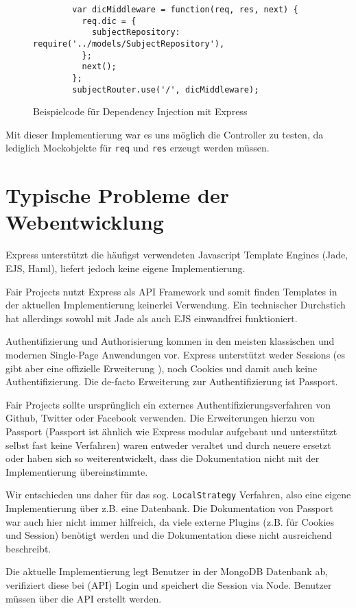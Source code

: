 \begin{figure}[h]
	\centering
	\begin{lstlisting}
		var dicMiddleware = function(req, res, next) {
		  req.dic = {
		    subjectRepository: require('../models/SubjectRepository'),
		  };
		  next();
		};
		subjectRouter.use('/', dicMiddleware);
	\end{lstlisting}
	\caption[dicMiddleware]{Beispielcode für Dependency Injection mit Express}
	\label{f:dicMiddleware}
\end{figure}

Mit dieser Implementierung war es uns möglich die Controller zu testen,
da lediglich Mockobjekte für \texttt{req} und \texttt{res} erzeugt
werden müssen.

\section{Typische Probleme der
Webentwicklung}\label{typische-probleme-der-webentwicklung}

Express unterstützt die häufigst verwendeten Javascript Template Engines
(Jade\cite{jade}, EJS\cite{ejs}, Haml\cite{haml}), liefert jedoch
keine eigene Implementierung.

Fair Projects nutzt Express als API Framework und somit finden Templates in der
aktuellen Implementierung keinerlei Verwendung. Ein technischer
Durchstich hat allerdings sowohl mit Jade als auch EJS einwandfrei funktioniert.

Authentifizierung und Authorisierung kommen in den meisten klassischen
und modernen Single-Page Anwendungen vor. Express unterstützt weder
Sessions (es gibt aber eine offizielle Erweiterung \cite{express-session}), noch
Cookies und damit auch keine Authentifizierung. Die de-facto Erweiterung
zur Authentifizierung ist Passport\cite{passport}.

Fair Projects sollte ursprünglich ein externes
Authentifizierungsverfahren von Github, Twitter oder Facebook verwenden.
Die Erweiterungen hierzu von Passport (Passport ist ähnlich wie Express
modular aufgebaut und unterstützt selbst fast keine Verfahren) waren
entweder veraltet und durch neuere ersetzt oder haben sich so
weiterentwickelt, dass die Dokumentation nicht mit der Implementierung
übereinstimmte.

Wir entschieden uns daher für das sog. \texttt{LocalStrategy} Verfahren,
also eine eigene Implementierung über z.B. eine Datenbank. Die
Dokumentation von Passport war auch hier nicht immer hilfreich, da viele
externe Plugins (z.B. für Cookies und Session) benötigt werden und die
Dokumentation diese nicht ausreichend beschreibt.

Die aktuelle Implementierung legt Benutzer in der MongoDB Datenbank ab,
verifiziert diese bei (API) Login und speichert die Session via Node.
Benutzer müssen über die API erstellt werden.